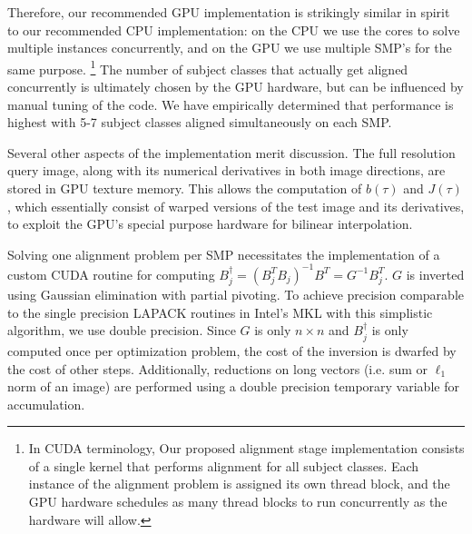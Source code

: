 \documentclass[10pt,twocolumn,letterpaper]{article}
\begin{document}
Therefore, our recommended GPU implementation is strikingly similar in spirit
to our recommended CPU implementation: on the CPU we use the cores to solve
multiple instances concurrently, and on the GPU we use multiple SMP's for the 
same purpose.
\footnote{In CUDA terminology, Our proposed alignment stage
implementation consists of a single kernel that performs alignment for all
subject classes.  Each instance of the alignment problem is assigned its own
thread block, and the GPU hardware schedules as many thread blocks to run
concurrently as the hardware will allow.} The number of subject classes that
actually get aligned concurrently is ultimately chosen by the GPU hardware, 
but can be influenced by manual tuning of the code. We have empirically determined
that performance is highest with 5-7 subject classes aligned simultaneously on each SMP.

Several other aspects of the implementation merit discussion.  
The full resolution query image, along with its numerical derivatives in both
image directions, are stored in GPU texture memory. This  allows the
computation of $b(\tau)$ and $J(\tau)$, which essentially consist of warped
versions of the test image and its derivatives, to exploit the GPU's special
purpose hardware for bilinear interpolation.

Solving one alignment problem per SMP necessitates the implementation of a
custom CUDA routine for computing $B_j^\dagger = (B_j^TB_j)^{-1} B^T = G^{-1} B_j^T$. $G$
is inverted using Gaussian elimination with partial pivoting.  To achieve
precision comparable to the single precision LAPACK routines in Intel's MKL
with this simplistic algorithm, we use double precision.  Since $G$ is only $n
\times n$ and $B_j^\dagger$ is only computed once per optimization problem, the
cost of the inversion is dwarfed by the cost of other steps.  
Additionally, reductions on long vectors (i.e. sum or $\ell_1$ norm
of an image) are performed using a double precision temporary variable for accumulation.
\end{document}
